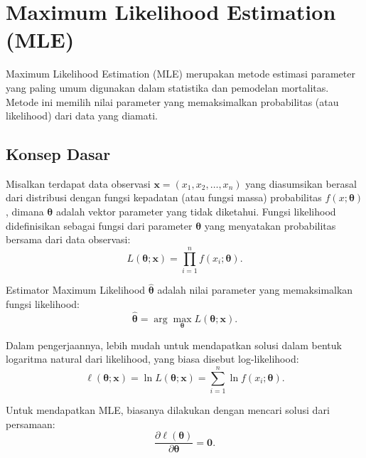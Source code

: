\section{Maximum Likelihood Estimation (MLE)}

Maximum Likelihood Estimation (MLE) merupakan metode estimasi parameter yang paling umum digunakan dalam statistika dan pemodelan mortalitas. Metode ini memilih nilai parameter yang memaksimalkan probabilitas (atau likelihood) dari data yang diamati.

\subsection{Konsep Dasar}

Misalkan terdapat data observasi $\mathbf{x} = (x_1, x_2, \ldots, x_n)$ yang diasumsikan berasal dari distribusi dengan fungsi kepadatan (atau fungsi massa) probabilitas $f(x; \boldsymbol{\theta})$, dimana $\boldsymbol{\theta}$ adalah vektor parameter yang tidak diketahui. Fungsi likelihood didefinisikan sebagai fungsi dari parameter $\boldsymbol{\theta}$ yang menyatakan probabilitas bersama dari data observasi:
\begin{equation}
L(\boldsymbol{\theta}; \mathbf{x}) = \prod_{i=1}^{n} f(x_i; \boldsymbol{\theta}).
\label{eq:likelihood_definition}
\end{equation}

Estimator Maximum Likelihood $\hat{\boldsymbol{\theta}}$ adalah nilai parameter yang memaksimalkan fungsi likelihood:
\begin{equation}
\hat{\boldsymbol{\theta}} = \arg\max_{\boldsymbol{\theta}} L(\boldsymbol{\theta}; \mathbf{x}).
\label{eq:mle_definition}
\end{equation}

Dalam pengerjaannya, lebih mudah untuk mendapatkan solusi dalam bentuk logaritma natural dari likelihood, yang biasa disebut log-likelihood:
\begin{equation}
\ell(\boldsymbol{\theta}; \mathbf{x}) = \ln L(\boldsymbol{\theta}; \mathbf{x}) = \sum_{i=1}^{n} \ln f(x_i; \boldsymbol{\theta}).
\label{eq:loglikelihood_definition}
\end{equation}

Untuk mendapatkan MLE, biasanya dilakukan dengan mencari solusi dari persamaan:
\begin{equation}
\frac{\partial \ell(\boldsymbol{\theta})}{\partial \boldsymbol{\theta}} = \mathbf{0}.
\label{eq:score_equation}
\end{equation}

